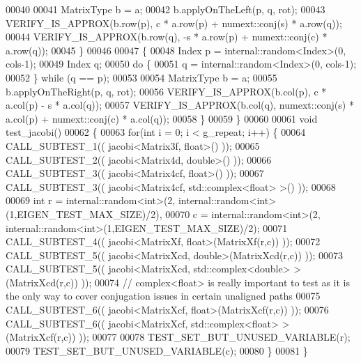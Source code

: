 \begin{DoxyCode}
00040 
00041     MatrixType b = a;
00042     b.applyOnTheLeft(p, q, rot);
00043     VERIFY\_IS\_APPROX(b.row(p), c * a.row(p) + numext::conj(s) * a.row(q));
00044     VERIFY\_IS\_APPROX(b.row(q), -s * a.row(p) + numext::conj(c) * a.row(q));
00045   \}
00046 
00047   \{
00048     Index p = internal::random<Index>(0, cols-1);
00049     Index q;
00050     \textcolor{keywordflow}{do} \{
00051       q = internal::random<Index>(0, cols-1);
00052     \} \textcolor{keywordflow}{while} (q == p);
00053 
00054     MatrixType b = a;
00055     b.applyOnTheRight(p, q, rot);
00056     VERIFY\_IS\_APPROX(b.col(p), c * a.col(p) - s * a.col(q));
00057     VERIFY\_IS\_APPROX(b.col(q), numext::conj(s) * a.col(p) + numext::conj(c) * a.col(q));
00058   \}
00059 \}
00060 
00061 \textcolor{keywordtype}{void} test\_jacobi()
00062 \{
00063   \textcolor{keywordflow}{for}(\textcolor{keywordtype}{int} i = 0; i < g\_repeat; i++) \{
00064     CALL\_SUBTEST\_1(( jacobi<Matrix3f, float>() ));
00065     CALL\_SUBTEST\_2(( jacobi<Matrix4d, double>() ));
00066     CALL\_SUBTEST\_3(( jacobi<Matrix4cf, float>() ));
00067     CALL\_SUBTEST\_3(( jacobi<Matrix4cf, std::complex<float> >() ));
00068 
00069     \textcolor{keywordtype}{int} r = internal::random<int>(2, internal::random<int>(1,EIGEN\_TEST\_MAX\_SIZE)/2),
00070         c = internal::random<int>(2, internal::random<int>(1,EIGEN\_TEST\_MAX\_SIZE)/2);
00071     CALL\_SUBTEST\_4(( jacobi<MatrixXf, float>(MatrixXf(r,c)) ));
00072     CALL\_SUBTEST\_5(( jacobi<MatrixXcd, double>(MatrixXcd(r,c)) ));
00073     CALL\_SUBTEST\_5(( jacobi<MatrixXcd, std::complex<double> >(MatrixXcd(r,c)) ));
00074     \textcolor{comment}{// complex<float> is really important to test as it is the only way to cover conjugation issues in
       certain unaligned paths}
00075     CALL\_SUBTEST\_6(( jacobi<MatrixXcf, float>(MatrixXcf(r,c)) ));
00076     CALL\_SUBTEST\_6(( jacobi<MatrixXcf, std::complex<float> >(MatrixXcf(r,c)) ));
00077     
00078     TEST\_SET\_BUT\_UNUSED\_VARIABLE(r);
00079     TEST\_SET\_BUT\_UNUSED\_VARIABLE(c);
00080   \}
00081 \}
\end{DoxyCode}
